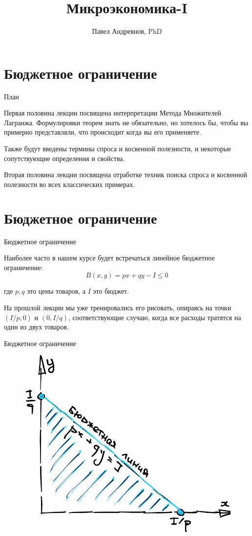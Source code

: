 \documentclass{beamer}
\title{
Микроэкономика-I
}
\author{
Павел Андреянов, PhD
}
\begin{document}
\maketitle

\section{Бюджетное ограничение}

\begin{frame}{План}

Первая половина лекции посвящена интерпретации Метода Множителей Лагранжа. Формулировки теорем знать не обязательно, но хотелось бы, чтобы вы примерно представляли, что происходит когда вы его применяете. 

Также будут введены термины спроса и косвенной полезности, и некоторые сопутствующие определения и свойства.

Вторая половина лекции посвящена отработке техник поиска спроса и косвенной полезности во всех классических примерах.

\end{frame}


\section{Бюджетное ограничение}

\begin{frame}{Бюджетное ограничение}

Наиболее часто в нашем курсе будет встречаться линейное бюджетное ограничение:
$$ B(x,y) = p x + q y - I \leqslant 0$$

где $p, q$ это цены товаров, а $I$ это бюджет. 

На прошлой лекции мы уже тренировались его рисовать, опираясь на точки $(I/p, 0)$ и $(0, I/q)$, соответствующие случаю, когда все расходы тратятся на один из двух товаров.

\end{frame}

\begin{frame}{Бюджетное ограничение}

\begin{figure}[hbt]
\centering
\includegraphics[width=.8 \textwidth]{budget_2d.png}
\end{figure}

\end{frame}
\end{document}
